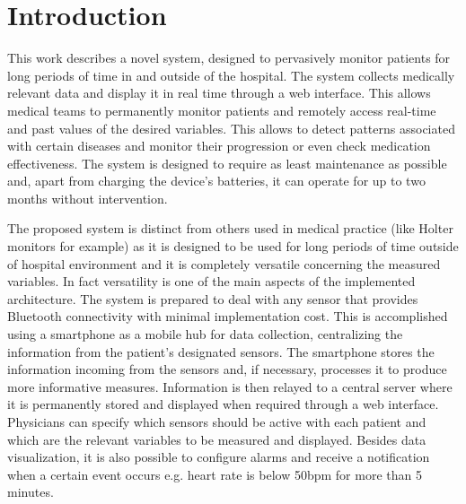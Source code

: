 
\chapter{Introduction}
\label{chapter:introduction}


This work describes a novel system, designed to pervasively monitor patients for long periods of time in and outside of the hospital. The system collects medically relevant data and display it in real time through a web interface. This allows medical teams to permanently monitor patients and remotely access real-time and past values of the desired variables. This allows to detect patterns associated with certain diseases and monitor their progression or even check medication effectiveness.
The system is designed to require as least maintenance as possible and, apart from charging the device's batteries, it can operate for up to two months without intervention.

The proposed system is distinct from others used in medical practice (like Holter monitors for example) as it is designed to be used for long periods of time outside of hospital environment and it is completely versatile concerning the measured variables. In fact versatility is one of the main aspects of the implemented architecture. The system is prepared to deal with any sensor that provides Bluetooth connectivity with minimal implementation cost. This is accomplished using a smartphone as a mobile hub for data collection, centralizing the information from the patient's designated sensors. The smartphone stores the information incoming from the sensors and, if necessary, processes it to produce more informative measures. Information is then relayed to a central server where it is permanently stored and displayed when required through a web interface. Physicians can specify which sensors should be active with each patient and which are the relevant variables to be measured and displayed. Besides data visualization, it is also possible to configure alarms and receive a notification when a certain event occurs e.g. heart rate is below 50\ac{bpm} for more than 5 minutes.

